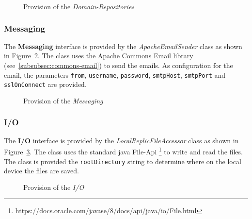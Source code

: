 \begin{figure}
    \centering

    \caption{Provision of the \textit{Domain-Repositories}}
    \label{fig:domain-repositories-p}
\end{figure}

\subsubsection{Messaging}
The \textbf{Messaging} interface is provided by the \textit{ApacheEmailSender} class as shown in Figure~\ref{fig:domain-messaging-p}.
The class uses the Apache Commons Email library (see~\ref{subsubsec:commons-email}) to send the emails.
As configuration for the email, the parameters \texttt{from}, \texttt{username}, \texttt{password}, \texttt{smtpHost}, \texttt{smtpPort} and \texttt{sslOnConnect} are provided.

\begin{figure}
    \centering

    \caption{Provision of the \textit{Messaging}}
    \label{fig:domain-messaging-p}
\end{figure}

\subsubsection{I/O}
The \textbf{I/O} interface is provided by the \textit{LocalReplicFileAccessor} class as shown in Figure~\ref{fig:domain-io-p}.
The class uses the standard java File-Api \footnote{https://docs.oracle.com/javase/8/docs/api/java/io/File.html} to write and read the files.
The class is provided the \texttt{rootDirectory} string to determine where on the local device the files are saved.

\begin{figure}
    \centering

    \caption{Provision of the \textit{I/O}}
    \label{fig:domain-io-p}
\end{figure}

